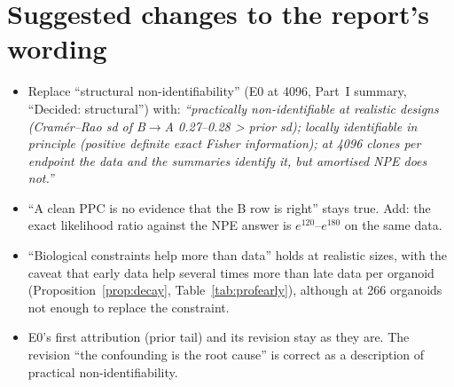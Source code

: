 \documentclass[11pt]{article}
\theoremstyle{definition}
\theoremstyle{remark}
\begin{document}
\section{Suggested changes to the report's wording}\label{sec:wording}
\begin{itemize}
\item Replace ``structural non-identifiability'' (E0 at 4096, Part~I summary, ``Decided: structural'') with: \emph{``practically non-identifiable at realistic designs (Cram\'er--Rao sd of B$\to$A 0.27--0.28 > prior sd); locally identifiable in principle (positive definite exact Fisher information); at 4096 clones per endpoint the data and the summaries identify it, but amortised NPE does not.''}
\item ``A clean PPC is no evidence that the B row is right'' stays true. Add: the exact likelihood ratio against the NPE answer is $e^{120}$--$e^{180}$ on the same data.
\item ``Biological constraints help more than data'' holds at realistic sizes, with the caveat that early data help several times more than late data per organoid (Proposition~\ref{prop:decay}, Table~\ref{tab:profearly}), although at 266 organoids not enough to replace the constraint.
\item E0's first attribution (prior tail) and its revision stay as they are. The revision ``the confounding is the root cause'' is correct as a description of practical non-identifiability.
\end{itemize}

\end{document}

